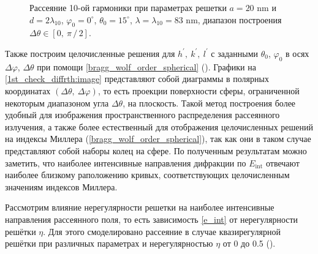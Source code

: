 \begin{figure}[H]
    \hfil
    \caption{Рассеяние 10-ой гармоники при параметрах решетки $a = 20$ nm и $d = 2\lambda_{10}$, $\varphi_0 = 0^{\circ}$, $\theta_0 = 15^{\circ}$, $\lambda = \lambda_{10} = 83$ nm, диапазон построения $\Delta \theta \in \left[ 0,\:\pi\,/\,2 \right]$.}\label{1st_check_diffrth:image}
\end{figure}

Также построим целочисленные решения для $h^\prime,\:k^\prime,\:l^\prime$ с заданными $\theta_0$, $\varphi_0$ в осях $\Delta \varphi$, $\Delta \theta$ при помощи \autoref{bragg_wolf_order_spherical} (). Графики на \autoref{1st_check_diffrth:image} представляют собой диаграммы в полярных координатах $(\Delta \theta, \: \Delta \varphi)$, то есть проекции поверхности сферы, ограниченной некоторым диапазоном угла $\Delta \theta$, на плоскость. Такой метод построения более удобный для изображения пространственного распределения рассеянного излучения, а также более естественный для отображения целочисленных решений на индексы Миллера (\autoref{bragg_wolf_order_spherical}), так как они в таком случае представляют собой наборы колец на сфере. По полученным результатам можно заметить, что наиболее интенсивные направления дифракции по $E_{\textrm{int}}$ отвечают наиболее близкому раположению кривых, соответствующих целочисленным значениям индексов Миллера.

Рассмотрим влияние нерегулярности решетки на наиболее интенсивные направления рассеянного поля, то есть зависимость \autoref{e_int} от нерегулярности решётки $\eta$. Для этого смоделировано рассеяние в случае квазирегулярной решётки при различных параметрах и нерегулярностью $\eta$ от 0 до 0.5 ().


